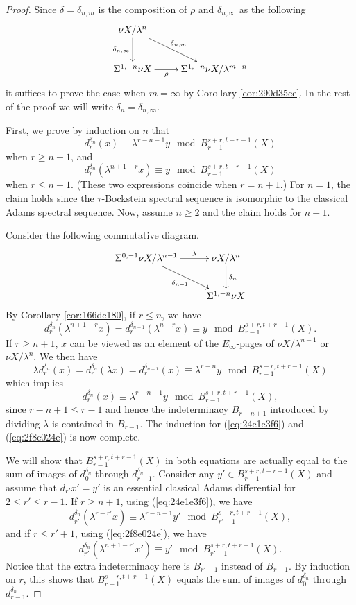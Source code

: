 \documentclass{amsart}
\numberwithin{equation}{section}
\begin{document}
\begin{proof}
    Since $\delta=\delta_{n,m}$ is the composition of $\rho$ and $\delta_{n,\infty}$ as the following
     $$\xymatrix{
    \nu X/\lambda^n\ar[d]_-{\delta_{n,\infty}} \ar[rd]^{\delta_{n,m}} & \\
    \Sus^{1,-n}\nu X\ar[r]_-{\rho} & \Sus^{1,-n}\nu X/\lambda^{m-n}
    }$$
    it suffices to prove the case when $m=\infty$ by Corollary \ref{cor:290d35ce}. In the rest of the proof we will write $\delta_n=\delta_{n,\infty}$.

    First, we prove by induction on $n$ that
    \begin{equation}\label{eq:24e1e3f6}
        d^{\delta_n}_r(x)\equiv \lambda^{r-n-1}y\mod B_{r-1}^{s+r,t+r-1}(X)
    \end{equation}
    when $r\ge n+1$, and
    \begin{equation}\label{eq:2f8e024e}
        d^{\delta_n}_r(\lambda^{n+1-r}x)\equiv y\mod B_{r-1}^{s+r,t+r-1}(X)
    \end{equation}
    when $r\le n+1$. (These two expressions coincide when $r=n+1$.) For $n=1$, the claim holds since the $\tau$-Bockstein spectral sequence is isomorphic to the classical Adams spectral sequence. Now, assume $n\ge 2$ and the claim holds for $n-1$.
    
    Consider the following commutative diagram.
    $$\xymatrix{
        \Sus^{0,-1}\nu X/\lambda^{n-1} \ar[rd]_-{\delta_{n-1}} \ar[r]^-\lambda &  \nu X/\lambda^{n}\ar[d]^-{\delta_{n}}\\
        & \Sus^{1,-n}\nu X\\
    }$$
    By Corollary \ref{cor:166dc180}, if $r\le n$, we have
    $$d^{\delta_{n}}_r(\lambda^{n+1-r}x)=d^{\delta_{n-1}}_r(\lambda^{n-r}x)\equiv y\mod B_{r-1}^{s+r,t+r-1}(X).$$
    If $r\ge n+1$, $x$ can be viewed as an element of the $E_\infty$-pages of $\nu X/\lambda^{n-1}$ or $\nu X/\lambda^n$. We then have
    $$\lambda d^{\delta_{n}}_r(x)=d^{\delta_{n}}_r(\lambda x)=d^{\delta_{n-1}}_r(x)\equiv \lambda^{r-n}y \mod B_{r-1}^{s+r,t+r-1}(X)$$
    which implies
    $$d^{\delta_{n}}_r(x)\equiv\lambda^{r-n-1}y\mod B_{r-1}^{s+r,t+r-1}(X),$$
    since $r-n+1\le r-1$ and hence the indeterminacy $B_{r-n+1}$ introduced by dividing $\lambda$ is contained in $B_{r-1}$. The induction for (\ref{eq:24e1e3f6}) and (\ref{eq:2f8e024e}) is now complete.

    We will show that
    $B_{r-1}^{s+r,t+r-1}(X)$ in both equations are actually equal to the sum of images of $d^{\delta_{n}}_0$ through $d^{\delta_{n}}_{r-1}$.
    Consider any $y'\in B_{r-1}^{s+r,t+r-1}(X)$ and assume that $d_{r'}x'=y'$ is an essential classical Adams differential for $2\le r'\le r-1$. If $r\ge n+1$, using (\ref{eq:24e1e3f6}), we have
    $$d^{\delta_n}_{r'}(\lambda^{r-r'}x)\equiv \lambda^{r-n-1}y'\mod B_{r'-1}^{s+r,t+r-1}(X),$$
    and if $r\leq r'+1$, using (\ref{eq:2f8e024e}), we have
    $$d^{\delta_n}_{r'}(\lambda^{n+1-r'}x')\equiv y'\mod B_{r'-1}^{s+r,t+r-1}(X).$$
    Notice that the extra indeterminacy here is $B_{r'-1}$ instead of $B_{r-1}$. By induction on $r$, this shows that $B_{r-1}^{s+r,t+r-1}(X)$ equals the sum of images of $d^{\delta_{n}}_0$ through $d^{\delta_{n}}_{r-1}$.
    

\end{proof}
\end{document}
